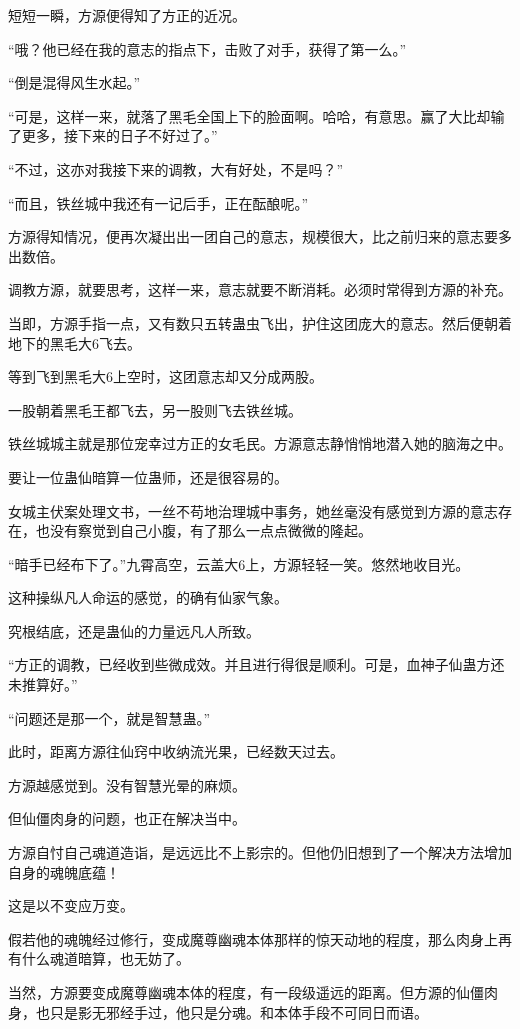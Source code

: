 \begin{this_body}
短短一瞬，方源便得知了方正的近况。

“哦？他已经在我的意志的指点下，击败了对手，获得了第一么。”

“倒是混得风生水起。”

“可是，这样一来，就落了黑毛全国上下的脸面啊。哈哈，有意思。赢了大比却输了更多，接下来的日子不好过了。”

“不过，这亦对我接下来的调教，大有好处，不是吗？”

“而且，铁丝城中我还有一记后手，正在酝酿呢。”

方源得知情况，便再次凝出出一团自己的意志，规模很大，比之前归来的意志要多出数倍。

调教方源，就要思考，这样一来，意志就要不断消耗。必须时常得到方源的补充。

当即，方源手指一点，又有数只五转蛊虫飞出，护住这团庞大的意志。然后便朝着地下的黑毛大6飞去。

等到飞到黑毛大6上空时，这团意志却又分成两股。

一股朝着黑毛王都飞去，另一股则飞去铁丝城。

铁丝城城主就是那位宠幸过方正的女毛民。方源意志静悄悄地潜入她的脑海之中。

要让一位蛊仙暗算一位蛊师，还是很容易的。

女城主伏案处理文书，一丝不苟地治理城中事务，她丝毫没有感觉到方源的意志存在，也没有察觉到自己小腹，有了那么一点点微微的隆起。

“暗手已经布下了。”九霄高空，云盖大6上，方源轻轻一笑。悠然地收目光。

这种操纵凡人命运的感觉，的确有仙家气象。

究根结底，还是蛊仙的力量远凡人所致。

“方正的调教，已经收到些微成效。并且进行得很是顺利。可是，血神子仙蛊方还未推算好。”

“问题还是那一个，就是智慧蛊。”

此时，距离方源往仙窍中收纳流光果，已经数天过去。

方源越感觉到。没有智慧光晕的麻烦。

但仙僵肉身的问题，也正在解决当中。

方源自忖自己魂道造诣，是远远比不上影宗的。但他仍旧想到了一个解决方法增加自身的魂魄底蕴！

这是以不变应万变。

假若他的魂魄经过修行，变成魔尊幽魂本体那样的惊天动地的程度，那么肉身上再有什么魂道暗算，也无妨了。

当然，方源要变成魔尊幽魂本体的程度，有一段级遥远的距离。但方源的仙僵肉身，也只是影无邪经手过，他只是分魂。和本体手段不可同日而语。


\end{this_body}
